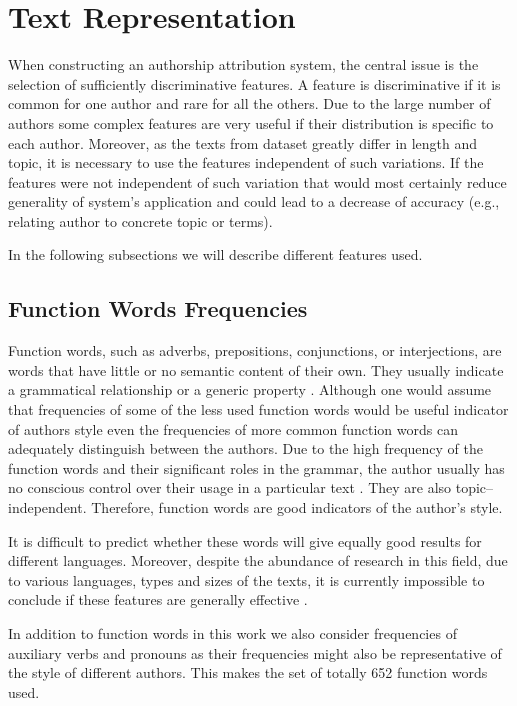 \documentclass{llncs}
\begin{document}
\section{Text Representation}
When constructing an authorship attribution system, the central issue is the
selection of sufficiently discriminative features. A feature is discriminative if
it is common for one author and rare for all the others. Due to the large number
of authors some complex features are very useful if their distribution is
specific to each author. Moreover, as the texts from dataset greatly differ in
length and topic, it is necessary to use the features independent of such
variations. If the features were not independent of such variation that
would most certainly reduce generality of system's application and could lead
to a decrease of accuracy (e.g., relating author to concrete topic or terms).

In the following subsections we will describe different features used.

\subsection{Function Words Frequencies}
\label{sec:funkcijske-rijeci}
Function words, such as adverbs, prepositions, conjunctions, or interjections,
are words that have little or no semantic content of their own. They usually
indicate a grammatical relationship or a generic property
\cite{zhao2005effective}. Although one would assume that frequencies of some of
the less used function words would be useful indicator of authors style even the
frequencies of more common function words can adequately distinguish between the
authors. Due to the high frequency of the function words and their significant
roles in the grammar, the author usually has no conscious control over their
usage in a particular text \cite{argamon2005measuring}. They are also
topic--independent. Therefore, function words are good indicators of the author's
style.

It is difficult to predict whether these words will give equally good results for
different languages. Moreover, despite the abundance of research in this field,
due to various languages, types and sizes of the texts, it is currently
impossible to conclude if these features are generally effective
\cite{zhao2005effective}.

In addition to function words in this work we also consider frequencies of
auxiliary verbs and pronouns as their frequencies might also be
representative of the style of different authors. This makes the set of totally
652 function words used.
\end{document}
